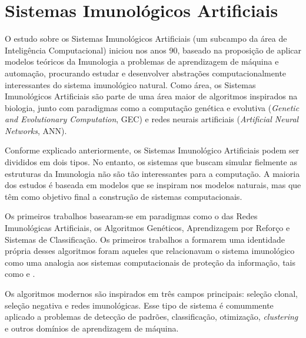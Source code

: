 \chapter{Sistemas Imunológicos Artificiais}

O estudo sobre os Sistemas Imunológicos Artificiais (um subcampo da área de Inteligência Computacional) iniciou nos anos 90, baseado na proposição de aplicar modelos teóricos da Imunologia a problemas de aprendizagem de máquina e automação, procurando estudar e desenvolver abstrações computacionalmente interessantes do sistema imunológico natural. Como área, os Sistemas Imunológicos Artificiais são parte de uma área maior de algoritmos inspirados na biologia, junto com paradigmas como a computação genética e evolutiva (\emph{Genetic and Evolutionary Computation}, GEC) e redes neurais artificiais (\emph{Artificial Neural Networks}, ANN).

Conforme explicado anteriormente, os Sistemas Imunológico Artificiais podem ser divididos em dois tipos. No entanto, os sistemas que buscam simular fielmente as estruturas da Imunologia não são tão interessantes para a computação. A maioria dos estudos é baseada em modelos que se inspiram nos modelos naturais, mas que têm como objetivo final a construção de sistemas computacionais.

Os primeiros trabalhos basearam-se em paradigmas como o das Redes Imunológicas Artificiais, os Algoritmos Genéticos, Aprendizagem por Reforço e Sistemas de Classificação. Os primeiros trabalhos a formarem uma identidade própria desses algoritmos foram aqueles que relacionavam o sistema imunológico como uma analogia aos sistemas computacionais de proteção da informação, tais como \citet{Forrest1994} e \citet{Forrest1997}.

Os algoritmos modernos são inspirados em três campos principais: seleção clonal, seleção negativa e redes imunológicas. Esse tipo de sistema é comummente aplicado a problemas de detecção de padrões, classificação, otimização, \emph{clustering} e outros domínios de aprendizagem de máquina.

